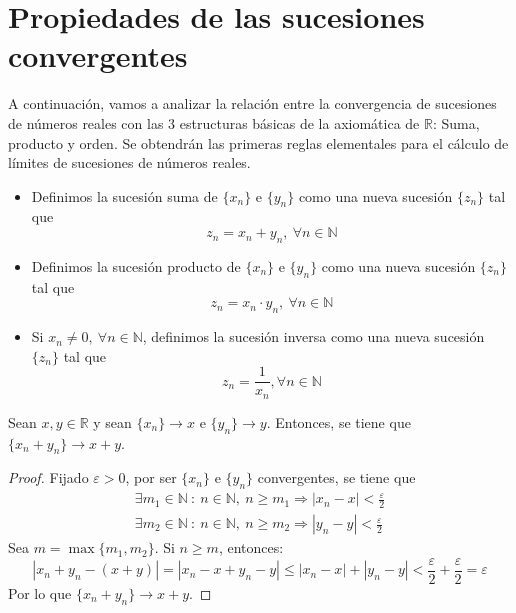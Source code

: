 \section{Propiedades de las sucesiones convergentes}
A continuación, vamos a analizar la relación entre la convergencia de sucesiones de números reales con las $3$ estructuras básicas de la axiomática de $\mathbb{R}$: Suma, producto y orden. Se obtendrán las primeras reglas elementales para el cálculo de límites de sucesiones de números reales.
\begin{itemize}
    \item Definimos la sucesión suma de $\{x_n\}$ e $\{y_n\}$ como una nueva sucesión $\{z_n\}$ tal que
    \begin{equation*}
        z_n=x_n + y_n,~ \forall n \in \mathbb{N}
    \end{equation*}

    \item Definimos la sucesión producto de $\{x_n\}$ e $\{y_n\}$ como una nueva sucesión $\{z_n\}$ tal que
    \begin{equation*}
        z_n=x_n \cdot y_n,~ \forall n \in \mathbb{N}
    \end{equation*} 

    \item Si $x_n \neq 0, ~ \forall n \in \mathbb{N}$, definimos la sucesión inversa como una nueva sucesión $\{z_n\}$ tal que
    \begin{equation*}
        z_n=\frac{1}{x_n}, \forall n \in \mathbb{N}
    \end{equation*}
\end{itemize}

\begin{prop}\label{prop:5.3.1}
    Sean $x,y \in \mathbb{R}$ y sean $\{x_n\} \longrightarrow x$ e $\{y_n\} \longrightarrow y$. Entonces, se tiene que $\{x_n + y_n\} \longrightarrow x+y$.
\end{prop}
\begin{proof}
    Fijado $\varepsilon > 0$, por ser $\{x_n\}$ e $\{y_n\}$ convergentes, se tiene que
    \begin{gather*}
        \exists m_1 \in \mathbb{N} ~:~ n \in \mathbb{N},~ n \geq m_1 \Longrightarrow \left|x_n - x \right| < \frac{\varepsilon}{2} \\
        \exists m_2 \in \mathbb{N} ~:~ n \in \mathbb{N},~ n \geq m_2 \Longrightarrow \left|y_n - y \right| < \frac{\varepsilon}{2}
    \end{gather*}
    Sea $m = \max \{m_1,m_2\}$. Si $ n \geq m$, entonces:
    \begin{equation*}
        \left|x_n + y_n - (x+y) \right| = \left|x_n - x + y_n - y \right| \leq |x_n - x| + |y_n - y| < \frac{\varepsilon}{2} + \frac{\varepsilon}{2} = \varepsilon
    \end{equation*}
    Por lo que $\{x_n + y_n\} \longrightarrow x+y$.
\end{proof}

